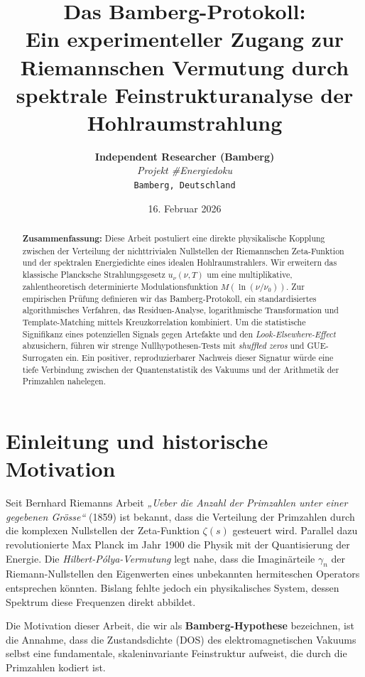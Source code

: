 \documentclass[11pt, a4paper]{article}
\title{\textbf{Das Bamberg-Protokoll:}\\ Ein experimenteller Zugang zur Riemannschen Vermutung durch spektrale Feinstrukturanalyse der Hohlraumstrahlung}
\author{
	\textbf{Independent Researcher (Bamberg)} \\
	\textit{Projekt \#Energiedoku} \\
	\texttt{Bamberg, Deutschland}
}
\date{16. Februar 2026}
\begin{document}
	
	\maketitle
	
	\begin{abstract}
		\noindent
		\textbf{Zusammenfassung:} Diese Arbeit postuliert eine direkte physikalische Kopplung zwischen der Verteilung der nichttrivialen Nullstellen der Riemannschen Zeta-Funktion und der spektralen Energiedichte eines idealen Hohlraumstrahlers. Wir erweitern das klassische Plancksche Strahlungsgesetz $u_\nu(\nu,T)$ um eine multiplikative, zahlentheoretisch determinierte Modulationsfunktion $M(\ln (\nu/\nu_0))$. Zur empirischen Prüfung definieren wir das \glqq Bamberg-Protokoll\grqq, ein standardisiertes algorithmisches Verfahren, das Residuen-Analyse, logarithmische Transformation und Template-Matching mittels Kreuzkorrelation kombiniert. Um die statistische Signifikanz eines potenziellen Signals gegen Artefakte und den \textit{Look-Elsewhere-Effect} abzusichern, führen wir strenge Nullhypothesen-Tests mit \textit{shuffled zeros} und GUE-Surrogaten ein. Ein positiver, reproduzierbarer Nachweis dieser Signatur würde eine tiefe Verbindung zwischen der Quantenstatistik des Vakuums und der Arithmetik der Primzahlen nahelegen.
	\end{abstract}
	
	\tableofcontents
	\newpage
	
	\section{Einleitung und historische Motivation}
	
	Seit Bernhard Riemanns Arbeit \textit{„Ueber die Anzahl der Primzahlen unter einer gegebenen Grösse“} (1859) ist bekannt, dass die Verteilung der Primzahlen durch die komplexen Nullstellen der Zeta-Funktion $\zeta(s)$ gesteuert wird. Parallel dazu revolutionierte Max Planck im Jahr 1900 die Physik mit der Quantisierung der Energie. 
	Die \textit{Hilbert-Pólya-Vermutung} legt nahe, dass die Imaginärteile $\gamma_n$ der Riemann-Nullstellen den Eigenwerten eines unbekannten hermiteschen Operators entsprechen könnten. Bislang fehlte jedoch ein physikalisches System, dessen Spektrum diese Frequenzen direkt abbildet.
	
	Die Motivation dieser Arbeit, die wir als \textbf{Bamberg-Hypothese} bezeichnen, ist die Annahme, dass die Zustandsdichte (DOS) des elektromagnetischen Vakuums selbst eine fundamentale, skaleninvariante Feinstruktur aufweist, die durch die Primzahlen kodiert ist.
	
\end{document}
